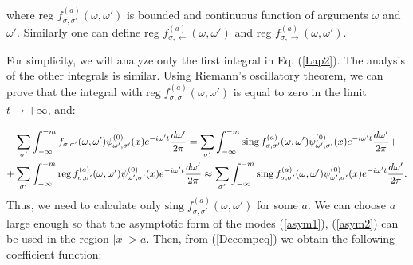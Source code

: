 \documentclass[12pt]{article}
\numberwithin{equation}{section}
\begin{document}
where reg $f^{(a)}_{\sigma,\sigma'}(\omega,\omega')$ is bounded and continuous function of arguments $\omega$ and $\omega'$. Similarly one can define reg $f^{(a)}_{\sigma,\leftarrow}(\omega,\omega')$ and reg $f^{(a)}_{\sigma,\rightarrow}(\omega,\omega')$. 

For simplicity, we will analyze only the first integral in Eq. (\ref{Lap2}). The analysis of the other integrals is similar. Using Riemann's oscillatory theorem, we can prove that the integral with $\text{reg}\;f^{(a)}_{\sigma,\sigma'}(\omega,\omega')$ is equal to zero in the limit $t\rightarrow +\infty$, and:

\begin{gather}
\sum_{\sigma'}\int^{-m}_{-\infty}f_{\sigma,\sigma'}(\omega,\omega')\mathit{\psi}^{(0)}_{\omega',\sigma'}(x)e^{-i\omega't}\frac{d\omega'}{2\pi}=\sum_{\sigma'}\int^{-m}_{-\infty} {\rm sing} \, f^{(a)}_{\sigma,\sigma'}(\omega,\omega')\mathit{\psi}^{(0)}_{\omega',\sigma'}(x)e^{-i\omega't}\frac{d\omega'}{2\pi}+\nonumber\\+\sum_{\sigma'}\int^{-m}_{-\infty}{\rm reg} \, f^{(a)}_{\sigma,\sigma'}(\omega,\omega')\mathit{\psi}^{(0)}_{\omega',\sigma'}(x)e^{-i\omega't}\frac{d\omega'}{2\pi}
\approx \sum_{\sigma'}\int^{-m}_{-\infty}{\rm sing} \, f^{(a)}_{\sigma,\sigma'}(\omega,\omega')\mathit{\psi}^{(0)}_{\omega',\sigma'}(x)e^{-i\omega't}\frac{d\omega'}{2\pi}.
\end{gather}
Thus, we need to calculate only $\text{sing}\; f^{(a)}_{\sigma,\sigma'}(\omega,\omega')$ for some $a$. We can choose $a$ large enough so that the asymptotic form of the modes (\ref{asym1}), (\ref{asym2}) can be used in the region $|x|>a$. Then, from (\ref{Decompeq}) we obtain the following coefficient function:
\end{document}
